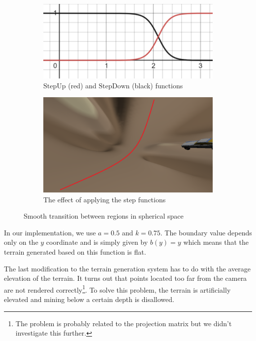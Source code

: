\begin{figure}[h]
    \centering
    \begin{subfigure}[b]{0.475\textwidth}
        \centering
        \includegraphics[width=\textwidth]{chapters/problems/resources/step-functions.png}
        \caption[]%
        {{\small $\mathrm{StepUp}$ (red) and $\mathrm{StepDown}$ (black) functions}}
        \label{fig:step-functions}
    \end{subfigure}
    \hfill
    \begin{subfigure}[b]{0.475\textwidth}
        \centering
        \includegraphics[width=\textwidth]{chapters/problems/resources/boundary-flat.png}
        \caption[]%
        {{\small The effect of applying the step functions}}
        \label{fig:stiched-spheres}
    \end{subfigure}
    \caption[]
    {\small Smooth transition between regions in spherical space}
    \label{fig:stiching-spheres}
\end{figure}
In our implementation, we use $a = 0.5$ and $k = 0.75$.
The boundary value depends only on the $y$ coordinate and is simply given by $b(y) = y$ which means that the terrain generated based on this function is flat.

The last modification to the terrain generation system has to do with the average elevation of the terrain.
It turns out that points located too far from the camera are not rendered correctly\footnote{The problem is probably related to the projection matrix but we didn't investigate this further.}.
To solve this problem, the terrain is artificially elevated and mining below a certain depth is disallowed.